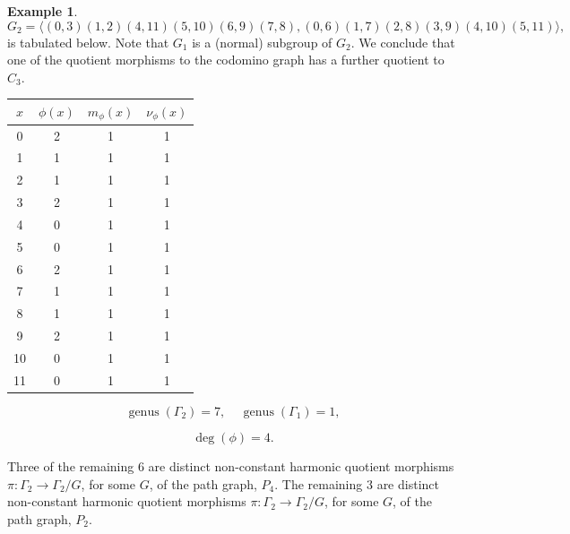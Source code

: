 \documentclass[12pt,letterpaper]{article}
\theoremstyle{definition}
\newtheorem{example}[theorem]{Example}
\DeclareMathOperator{\genus}{genus}
\begin{document}
\begin{example}
{\[
G_2=\langle (0,3)(1,2)(4,11)(5,10)(6,9)(7,8),
(0,6)(1,7)(2,8)(3,9)(4,10)(5,11) \rangle,
\]
is tabulated below. Note that $G_1$ is a (normal) subgroup of $G_2$.
We conclude that one of the quotient morphisms to the
codomino graph has a further quotient to $C_3$.

\begin{center}
\begin{tabular}{c|c|c|c}  
  $x$ & $\phi(x)$ & $m_\phi(x)$ & $\nu_\phi(x)$ \\ \hline
  0   &    2   &        1         &  1   \\ 
  1   &    1   &        1         &  1  \\ 
  2   &    1   &        1         &  1  \\ 
  3   &    2   &        1         &  1  \\ 
  4   &    0   &        1         &  1   \\ 
  5   &    0   &        1         &  1    \\ 
  6   &    2   &        1         &  1   \\ 
  7   &    1   &        1         &  1   \\
  8   &    1   &        1         &  1   \\
  9   &    2   &        1         &  1   \\
  10  &    0   &        1         &  1   \\
  11  &    0   &        1         &  1   \\ 
\end{tabular}
\end{center}

\[
  \genus(\Gamma_2) =7,\ \ \ \ \
  \genus(\Gamma_1) =1,
\]

\[
\deg(\phi) =4.
\]

Three of the remaining $6$ are distinct non-constant harmonic quotient
morphisms $\pi: \Gamma_2\to \Gamma_2/G$, for some $G$, of
the path graph, $P_4$.
The remaining $3$ are distinct non-constant harmonic quotient
morphisms $\pi: \Gamma_2\to \Gamma_2/G$, for some $G$, of
the path graph, $P_2$.

}
\end{example}
\end{document}
